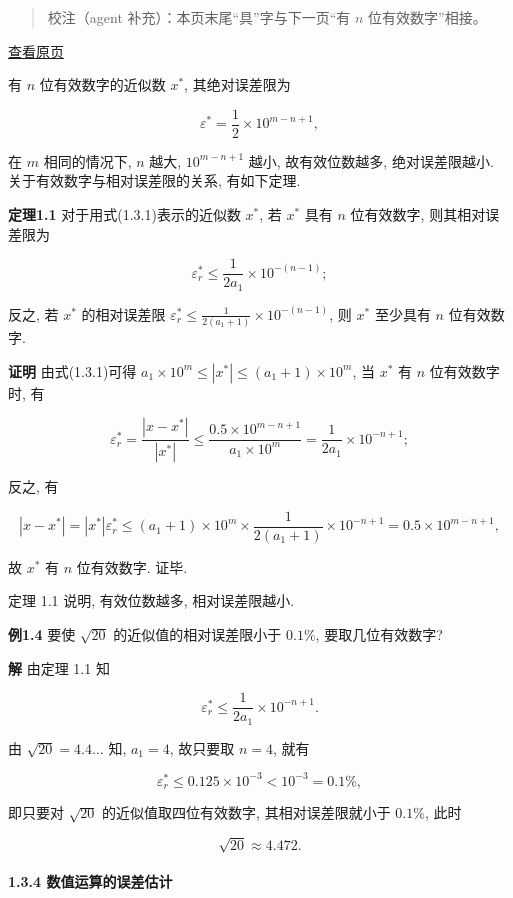 \documentclass[
  10pt,
  fontset=fandol]{ctexart}
\begin{document}
\begin{quote}
校注（agent 补充）：本页末尾``具''字与下一页``有 \(n\) 位有效数字''相接。
\end{quote}

\href{../../source-images/pdf-020.jpeg}{查看原页}

有 \(n\) 位有效数字的近似数 \(x^*\), 其绝对误差限为

\[
\varepsilon^* = \frac{1}{2} \times 10^{m-n+1},
\]

在 \(m\) 相同的情况下, \(n\) 越大, \(10^{m-n+1}\) 越小, 故有效位数越多, 绝对误差限越小. 关于有效数字与相对误差限的关系, 有如下定理.

\textbf{定理1.1} 对于用式(1.3.1)表示的近似数 \(x^*\), 若 \(x^*\) 具有 \(n\) 位有效数字, 则其相对误差限为

\[
\varepsilon_r^* \leqslant \frac{1}{2a_1} \times 10^{-(n-1)};
\]

反之, 若 \(x^*\) 的相对误差限 \(\varepsilon_r^* \leqslant \frac{1}{2(a_1+1)} \times 10^{-(n-1)}\), 则 \(x^*\) 至少具有 \(n\) 位有效数字.

\textbf{证明} 由式(1.3.1)可得 \(a_1 \times 10^m \leqslant |x^*| \leqslant (a_1+1) \times 10^m\), 当 \(x^*\) 有 \(n\) 位有效数字时, 有

\[
\varepsilon_r^* = \frac{|x-x^*|}{|x^*|} \leqslant \frac{0.5 \times 10^{m-n+1}}{a_1 \times 10^m} = \frac{1}{2a_1} \times 10^{-n+1};
\]

反之, 有

\[
|x-x^*| = |x^*| \varepsilon_r^* \leqslant (a_1+1) \times 10^m \times \frac{1}{2(a_1+1)} \times 10^{-n+1} = 0.5 \times 10^{m-n+1},
\]

故 \(x^*\) 有 \(n\) 位有效数字. 证毕.

定理 1.1 说明, 有效位数越多, 相对误差限越小.

\textbf{例1.4} 要使 \(\sqrt{20}\) 的近似值的相对误差限小于 \(0.1\%\), 要取几位有效数字?

\textbf{解} 由定理 1.1 知

\[
\varepsilon_r^* \leqslant \frac{1}{2a_1} \times 10^{-n+1}.
\]

由 \(\sqrt{20} = 4.4 \dots\) 知, \(a_1 = 4\), 故只要取 \(n=4\), 就有

\[
\varepsilon_r^* \leqslant 0.125 \times 10^{-3} < 10^{-3} = 0.1\%,
\]

即只要对 \(\sqrt{20}\) 的近似值取四位有效数字, 其相对误差限就小于 \(0.1\%\), 此时

\[
\sqrt{20} \approx 4.472.
\]

\paragraph{1.3.4 数值运算的误差估计}\label{ux6570ux503cux8fd0ux7b97ux7684ux8befux5deeux4f30ux8ba1}
\end{document}
